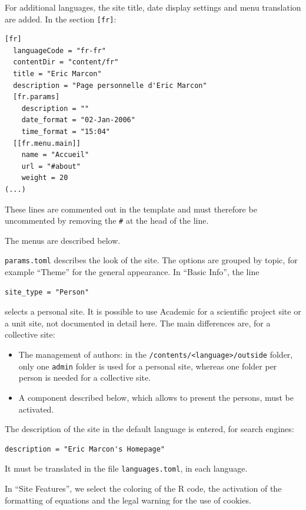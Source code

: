 \documentclass[
  12pt,
  american,
  a4paper,
  extrafontsizes,onecolumn,openright
  ]{memoir}
\providecommand{\tightlist}{%
  \setlength{\itemsep}{0pt}\setlength{\parskip}{0pt}}
\begin{document}
For additional languages, the site title, date display settings and menu translation are added.
In the section \texttt{{[}fr{]}}:

\begin{verbatim}
[fr]
  languageCode = "fr-fr"
  contentDir = "content/fr"
  title = "Eric Marcon"
  description = "Page personnelle d'Eric Marcon"
  [fr.params]
    description = ""
    date_format = "02-Jan-2006"
    time_format = "15:04"
  [[fr.menu.main]]
    name = "Accueil"
    url = "#about"
    weight = 20
(...)
\end{verbatim}

These lines are commented out in the template and must therefore be uncommented by removing the \texttt{\#} at the head of the line.

The menus are described below.

\texttt{params.toml} describes the look of the site.
The options are grouped by topic, for example \enquote{Theme} for the general appearance.
In \enquote{Basic Info}, the line

\begin{verbatim}
site_type = "Person"
\end{verbatim}

selects a personal site.
It is possible to use Academic for a scientific project site or a unit site, not documented in detail here.
The main differences are, for a collective site:

\begin{itemize}
\tightlist
\item
  The management of authors: in the \texttt{/contents/\textless{}language\textgreater{}/outside} folder, only one \texttt{admin} folder is used for a personal site, whereas one folder per person is needed for a collective site.
\item
  A component described below, which allows to present the persons, must be activated.
\end{itemize}

The description of the site in the default language is entered, for search engines:

\begin{verbatim}
description = "Eric Marcon's Homepage"
\end{verbatim}

It must be translated in the file \texttt{languages.toml}, in each language.

In \enquote{Site Features}, we select the coloring of the R code, the activation of the formatting of equations and the legal warning for the use of cookies.
\end{document}

